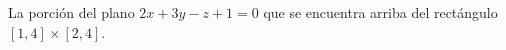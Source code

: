 \item La porción del plano $2x + 3y - z + 1 = 0$ que se encuentra arriba del rectángulo $[1, 4] \times [2, 4]$.
